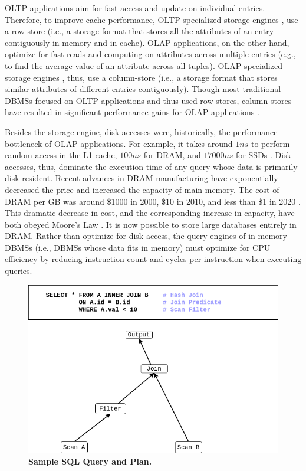 \documentclass[12pt]{cmuthesis}
\begin{document}
OLTP applications aim for fast access and update on individual entries. Therefore, to improve cache performance, OLTP-specialized storage engines \cite{mysql,postgres,aurora,voltdb}, use a row-store (i.e., a storage format that stores all the attributes of an entry contiguously in memory and in cache). OLAP applications, on the other hand, optimize for fast reads and computing on attributes across multiple entries (e.g., to find the average value of an attribute across all tuples). OLAP-specialized storage engines \cite{redshift,vertica,saphana,duckdb}, thus, use a column-store (i.e., a storage format that stores similar attributes of different entries contiguously). Though most traditional DBMSs \cite{postgres,mysql} focused on OLTP applications and thus used row stores, column stores have resulted in significant performance gains for OLAP applications \cite{abadi_phd,one_size_fits_all}.

Besides the storage engine, disk-accesses were, historically,  the performance bottleneck of OLAP applications. For example, it takes around $1ns$ to perform random access in the  L1 cache, $100ns$ for DRAM, and $17000ns$ for SSDs \cite{numbersbyyear}. Disk accesses, thus, dominate the execution time of any query whose data is primarily disk-resident. Recent advances in DRAM manufacturing have exponentially decreased the price and increased the capacity of main-memory. The cost of DRAM per GB was around \$1000 in 2000, \$10 in 2010, and less than \$1 in 2020 \cite{dramprices}. This dramatic decrease in cost, and the corresponding increase in capacity, have both obeyed Moore's Law \cite{moorelaw}. It is now possible to store large databases entirely in DRAM. Rather than optimize for disk access, the query engines of in-memory DBMSs (i.e., DBMSs whose data fits in memory) must optimize for CPU efficiency by reducing instruction count and cycles per instruction when executing queries.

\begin{figure}[t!]
    \centering
    \includegraphics[scale=0.5]{images/SampleQuery.png}
    \caption{\textbf{Sample SQL Query and Plan.}}
    \label{fig:intro_query}
\end{figure}
\end{document}

